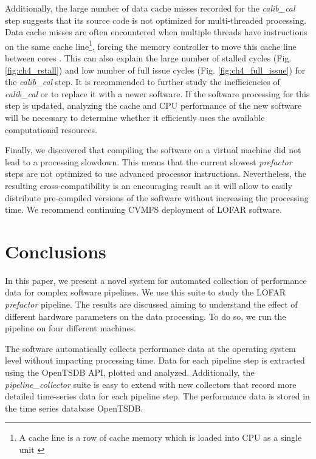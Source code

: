 Additionally, the large number of data cache misses recorded for the \textit{calib\_cal} step suggests that its source code is not optimized for multi-threaded processing. Data cache misses are often encountered when multiple threads have instructions on the same cache line\footnote{A cache line is a row of cache memory which is loaded into CPU as a single unit \citep{cache_architecture} }, forcing the memory controller to move this cache line between cores \citep{cache_misses}. This can also explain the large number of stalled cycles (Fig. \ref{fig:ch4_rstall}) and low number of full issue cycles (Fig. \ref{fig:ch4_full_issue}) for the \textit{calib\_cal} step. It is recommended to further study the inefficiencies of  \textit{calib\_cal} or to replace it with a newer software. If the software processing for this step is updated, analyzing the cache and CPU performance of the new software will be necessary to determine whether it efficiently uses the available computational resources. 


Finally, we discovered that compiling the software on a virtual machine did not lead to a processing slowdown. This means that the current slowest \textit{prefactor} steps are not optimized to use advanced processor instructions. Nevertheless, the resulting cross-compatibility is an encouraging result as it will allow to easily distribute pre-compiled versions of the software without increasing the processing time. We recommend continuing CVMFS deployment of LOFAR software. 


\section{Conclusions}
 
In this paper, we present a novel system for automated collection of performance data for complex software pipelines. We use this suite to study the LOFAR \textit{prefactor} pipeline. The results are discussed aiming to understand the effect of different hardware parameters on the data processing. To do so, we run the pipeline on four different machines. 

The software automatically collects performance data at the operating system level without impacting processing time. Data for each pipeline step is extracted using the OpenTSDB API, plotted and analyzed. Additionally, the \textit{pipeline\_collector} suite is easy to extend with new collectors that record more detailed time-series data for each pipeline step. The performance data is stored in the time series database OpenTSDB.

